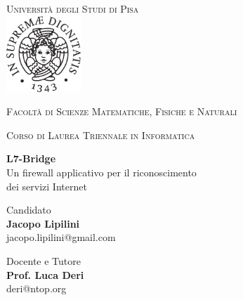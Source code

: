 \begin{titlepage}

\begin{center}
\large
\textsc{\Large Università degli Studi di Pisa\\}
\vspace{0.2cm}
\includegraphics[width=2.8cm]{img/logo_unipi.pdf}

\vspace{0.2cm}
\textsc{\large Facoltà di Scienze Matematiche, Fisiche e Naturali}\\ \vspace{0.1cm}

\textsc{\Large{Corso di Laurea Triennale in Informatica}}\\

\vspace{3cm}

{\Huge\textbf{L7-Bridge}}\\[0.2cm]
{\Large{Un firewall applicativo per il riconoscimento\\dei servizi Internet}}\\[0.2cm]

\vspace{6cm}

\begin{minipage}{0.45\linewidth}
\begin{center}
{\Large Candidato\\} \vspace{0.07cm} \textbf{{\Large Jacopo Lipilini}}\\
\vspace{-0.0cm} {\normalsize \ttfamily jacopo.lipilini@gmail.com}
\end{center}
\end{minipage}
\hfill
\begin{minipage}{0.45\linewidth}
\begin{center}
{\Large Docente e Tutore\\} \vspace{0.07cm} \textbf{{\Large Prof. Luca Deri}}\\
\vspace{-0.0cm} {\normalsize \ttfamily deri@ntop.org}
\end{center}
\end{minipage}

\end{center}

\end{titlepage}